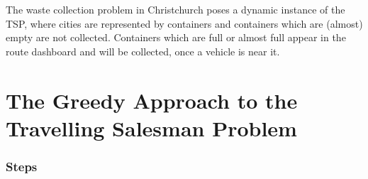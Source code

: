 \documentclass[10pt]{article}
\begin{document}
The waste collection problem in Christchurch poses a dynamic instance of the TSP, where cities are represented by containers and containers which are (almost) empty are not collected. Containers which are full or almost full appear in the route dashboard and 
will be collected, once a vehicle is near it.

\section{The Greedy Approach to the Travelling Salesman Problem}
\label{sec:kpit}

\subsubsection*{Steps}
\end{document}
